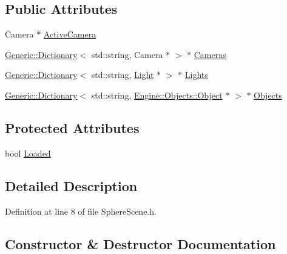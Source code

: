 \subsection*{Public Attributes}
\begin{DoxyCompactItemize}
\item 
Camera $\ast$ \mbox{\hyperlink{classEngine_1_1Components_1_1Scene_a9408befee37d89e2c001d25b9e4ed75a}{Active\+Camera}}
\item 
\mbox{\hyperlink{classGeneric_1_1Dictionary}{Generic\+::\+Dictionary}}$<$ std\+::string, Camera $\ast$ $>$ $\ast$ \mbox{\hyperlink{classEngine_1_1Components_1_1Scene_aea98ff1ced88ee859878b504e9a2a362}{Cameras}}
\item 
\mbox{\hyperlink{classGeneric_1_1Dictionary}{Generic\+::\+Dictionary}}$<$ std\+::string, \mbox{\hyperlink{classLight}{Light}} $\ast$ $>$ $\ast$ \mbox{\hyperlink{classEngine_1_1Components_1_1Scene_a00f60de2f6c72242a7af0076a3b75e5e}{Lights}}
\item 
\mbox{\hyperlink{classGeneric_1_1Dictionary}{Generic\+::\+Dictionary}}$<$ std\+::string, \mbox{\hyperlink{classEngine_1_1Objects_1_1Object}{Engine\+::\+Objects\+::\+Object}} $\ast$ $>$ $\ast$ \mbox{\hyperlink{classEngine_1_1Components_1_1Scene_a23481feabaaa56bf5613765db03af4da}{Objects}}
\end{DoxyCompactItemize}
\subsection*{Protected Attributes}
\begin{DoxyCompactItemize}
\item 
bool \mbox{\hyperlink{classEngine_1_1Components_1_1Scene_ae828757eea5410550f6674421051a783}{Loaded}}
\end{DoxyCompactItemize}


\subsection{Detailed Description}


Definition at line 8 of file Sphere\+Scene.\+h.



\subsection{Constructor \& Destructor Documentation}
\mbox{\label{classApplication_1_1Scenes_1_1SphereScene_a5880969092c7164e61a4236860c121c1}} 
